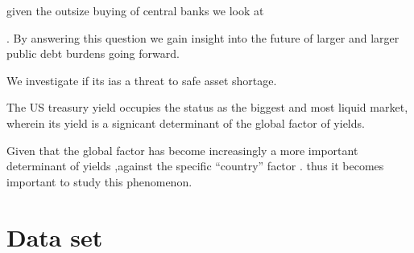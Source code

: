 \documentclass[
  12pt]{article}
\begin{document}
given the outsize buying of central banks we look at

. By answering this question we gain insight into the future of larger
and larger public debt burdens going forward.

We investigate if its ias a threat to safe asset shortage.

The US treasury yield occupies the status as the biggest and most liquid
market, wherein its yield is a signicant determinant of the global
factor of yields.

Given that the global factor has become increasingly a more important
determinant of yields ,against the specific ``country'' factor
\citet{mauro2002}. thus it becomes important to study this
phenomenon.\citep{rozada2006, gonzález-rozada2008, longstaff2011}

\hypertarget{sec-dataset}{%
\section{Data set}\label{sec-dataset}}


\renewcommand\refname{References}
  
\end{document}
